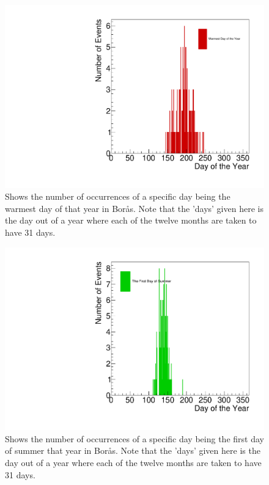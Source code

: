 \documentclass[a4, 12pt]{article}
\begin{document}
\begin{figure}[H]
\centering
\includegraphics[scale=0.50]{philipHot.pdf}
\caption{Shows the number of occurrences of a specific day being the warmest day of that year in Borås. Note that the 'days' given here is the day out of a year where each of the twelve months are taken to have 31 days.}
\end{figure}

\begin{figure}[H]
\centering
\includegraphics[scale=0.50]{philipSummer.pdf}
\caption{Shows the number of occurrences of a specific day being the first day of summer that year in Borås. Note that the 'days' given here is the day out of a year where each of the twelve months are taken to have 31 days.}
\end{figure}
\newpage
\end{document}
